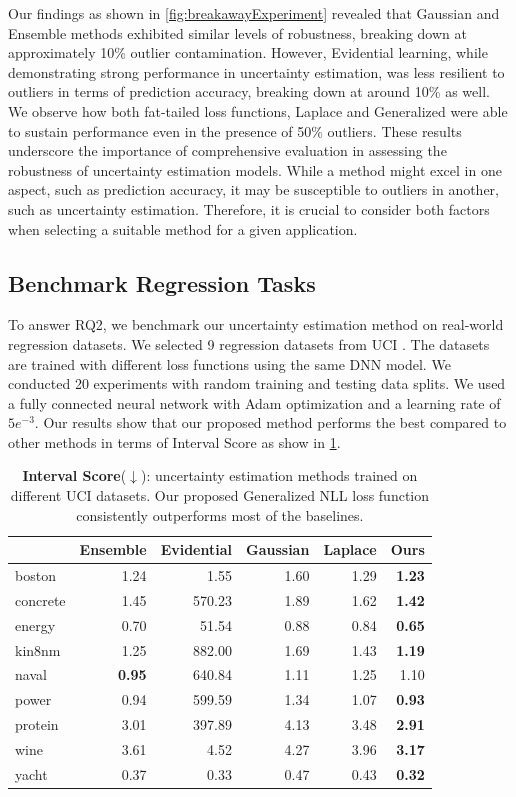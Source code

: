 \documentclass[letterpaper, 10 pt, conference]{ieeeconf}  %
\begin{document}
Our findings as shown in \cref{fig:breakawayExperiment} revealed that Gaussian and Ensemble methods exhibited similar levels of robustness, breaking down at approximately 10\% outlier contamination. However, Evidential learning, while demonstrating strong performance in uncertainty estimation, was less resilient to outliers in terms of prediction accuracy, breaking down at around 10\% as well.
We observe how both fat-tailed loss functions, Laplace and Generalized were able to sustain performance even in the presence of 50\% outliers.  
These results underscore the importance of comprehensive evaluation in assessing the robustness of uncertainty estimation models. 
While a method might excel in one aspect, such as prediction accuracy, it may be susceptible to outliers in another, such as uncertainty estimation. Therefore, it is crucial to consider both factors when selecting a suitable method for a given application.

\subsection{Benchmark Regression Tasks}
To answer RQ2, we benchmark our uncertainty estimation method on real-world regression datasets.
We selected 9 regression datasets from UCI \cite{ucimlrepo}. 
The datasets are trained with different loss functions using the same DNN model.  
We conducted 20 experiments with random training and testing data splits. We used a fully connected neural network with Adam optimization and a learning rate of $5e^{-3}$. 
Our results show that our proposed method performs the best compared to other methods in terms of Interval Score as show in \cref{tab:ISTable}.

\begin{table}[t]
\centering
\begin{tabular}{l|r|r|r|r|r}
 & Ensemble & Evidential & Gaussian & Laplace & Ours \\
 \hline
boston & 1.24 & 1.55 & 1.60 & 1.29 & \textbf{1.23} \\
concrete & 1.45 & 570.23 & 1.89 & 1.62 & \textbf{1.42} \\
energy & 0.70 & 51.54 & 0.88 & 0.84 & \textbf{0.65} \\
kin8nm & 1.25 & 882.00 & 1.69 & 1.43 & \textbf{1.19} \\
naval & \textbf{0.95} & 640.84 & 1.11 & 1.25 & 1.10 \\
power & 0.94 & 599.59 & 1.34 & 1.07 & \textbf{0.93} \\
protein & 3.01 & 397.89 & 4.13 & 3.48 & \textbf{2.91} \\
wine & 3.61 & 4.52 & 4.27 & 3.96 & \textbf{3.17} \\
yacht & 0.37 & 0.33 & 0.47 & 0.43 & \textbf{0.32} \\
 \hline

\end{tabular}
\caption{\textbf{Interval Score}($\downarrow$): uncertainty estimation methods trained on different UCI datasets. Our proposed Generalized NLL loss function consistently outperforms most of the  baselines.}
\label{tab:ISTable}
\end{table}
\end{document}
